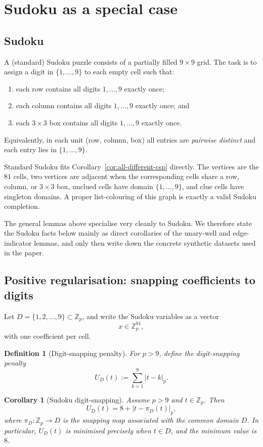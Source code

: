 \documentclass[11pt]{article}
\newtheorem{corollary}[theorem]{Corollary}
\newtheorem{definition}{Definition}
\begin{document}
\section{Sudoku as a special case}
\subsection{Sudoku}
A (standard) Sudoku puzzle consists of a partially filled $9\times 9$ grid. The task is to assign a digit in $\{1,\dots,9\}$ to each empty cell such that:
\begin{enumerate}
    \item each row contains all digits $1,\dots,9$ exactly once;
    \item each column contains all digits $1,\dots,9$ exactly once; and
    \item each $3\times 3$ box contains all digits $1,\dots,9$ exactly once.
\end{enumerate}
Equivalently, in each unit (row, column, box) all entries are \emph{pairwise distinct} and each entry lies in $\{1,\dots,9\}$.

Standard Sudoku fits Corollary~\ref{cor:all-different-csp} directly. The vertices are the $81$ cells, two vertices are adjacent when the corresponding cells share a row, column, or $3\times 3$ box, unclued cells have domain $\{1,\dots,9\}$, and clue cells have singleton domains. A proper list-colouring of this graph is exactly a valid Sudoku completion.

The general lemmas above specialise very cleanly to Sudoku. We therefore state the Sudoku facts below mainly as direct corollaries of the unary-well and edge-indicator lemmas, and only then write down the concrete synthetic datasets used in the paper.

\subsection{Positive regularisation: snapping coefficients to digits}

Let $D=\{1,2,\dots,9\}\subset \mathbb{Z}_p$, and write the Sudoku variables as a vector
\[
x \in \mathbb{Z}_p^{81},
\]
with one coefficient per cell.

\begin{definition}[Digit-snapping penalty]
For $p>9$, define the digit-snapping penalty
\[
U_D(t) := \sum_{k=1}^9 |t-k|_p.
\]
\end{definition}

\begin{corollary}[Sudoku digit-snapping]
\label{cor:sudoku-snapping}
Assume $p>9$ and $t\in \mathbb{Z}_p$. Then
\[
U_D(t)=8+|t-\pi_D(t)|_p,
\]
where \(\pi_D:\mathbb Z_p\to D\) is the snapping map associated with the common domain \(D\). In particular, \(U_D(t)\) is minimised precisely when \(t\in D\), and the minimum value is \(8\).
\end{corollary}
\end{document}
